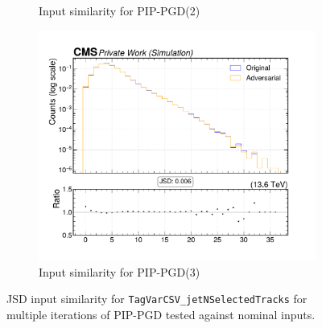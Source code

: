 \begin{figure}[htbp]
\begin{subfigure}[t]{0.32\textwidth}
    \caption*{Input similarity for PIP-PGD(2)}
  \end{subfigure}\hfill
  \begin{subfigure}[t]{0.32\textwidth}
    \includegraphics[width=\linewidth]{media/output/features/compare/combined_it_3/cmp_global_features_TagVarCSV_jetNSelectedTracks.pdf}
    \caption*{Input similarity for PIP-PGD(3)}
  \end{subfigure}

  \caption*{JSD input similarity for \texttt{TagVarCSV\_jetNSelectedTracks} for multiple iterations of PIP-PGD tested against nominal inputs.}
  \label{fig:combined_input_TagVarCSV_jetNSelectedTracks}
\end{figure}

